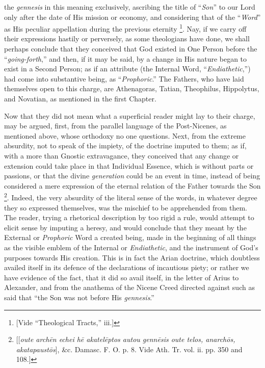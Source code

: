 the \emph{gennesis} in this meaning exclusively, ascribing the title
of ``\emph{Son}'' to our Lord only after the date of His
mission or economy, and considering that of the ``\emph{Word}''
as His peculiar appellation during the previous eternity \footnote{[Vide ``Theological Tracts,''
iii.]}. Nay, if we carry off their expressions hastily or perversely,
as some theologians have done, we shall perhaps conclude that they
conceived that God existed in One Person before the ``\emph{going-forth},''
and then, if it may be said, by a change in His nature began to exist
in a Second Person; as if an attribute (the Internal Word, ``\emph{Endiathetic},'')
had come into substantive being, as ``\emph{Prophoric}.'' The
Fathers, who have laid themselves open to this charge, are Athenagoras,
Tatian, Theophilus, Hippolytus, and Novatian, as mentioned in the
first Chapter.

Now that they did not mean what a superficial reader might lay to
their charge, may be argued, first, from the parallel language of the
Post-Nicenes, as mentioned above, whose orthodoxy no one questions.
Next, from the extreme absurdity, not to speak of the impiety, of the
doctrine imputed to them; as if, with a more than Gnostic
extravagance, they conceived that any change or extension could take
place in that Individual Essence, which is without parts or passions,
or that the divine \emph{generation} could be an event in time,
instead of being considered a mere expression of the eternal relation
of the Father towards the Son \footnote{[[\emph{oute arch\={e}n echei h\={e}
akatel\={e}ptos autou genn\={e}sis oute telos, anarch\={o}s,
akatapaust\={o}s}], \&c. Damasc. F. O. p. 8. Vide Ath. Tr.
vol. ii. pp. 350 and 108.]}. Indeed, the very absurdity of the literal sense of the words,
in whatever degree they so expressed themselves, was the mischief to
be apprehended from them. The reader, trying a rhetorical description
by too rigid a rule, would attempt to elicit sense by imputing a
heresy, and would conclude that they meant by the External or \emph{Prophoric}
Word a created being, made in the beginning of all things as the
visible emblem of the Internal or \emph{Endiathetic}, and the
instrument of God's purposes towards His creation. This is in fact the
Arian doctrine, which doubtless availed itself in its defence of the
declarations of incautious piety; or rather we have evidence of the
fact, that it did so avail itself, in the letter of Arius to
Alexander, and from the anathema of the Nicene Creed directed against
such as said that ``the Son was not before His \emph{gennesis}.''

